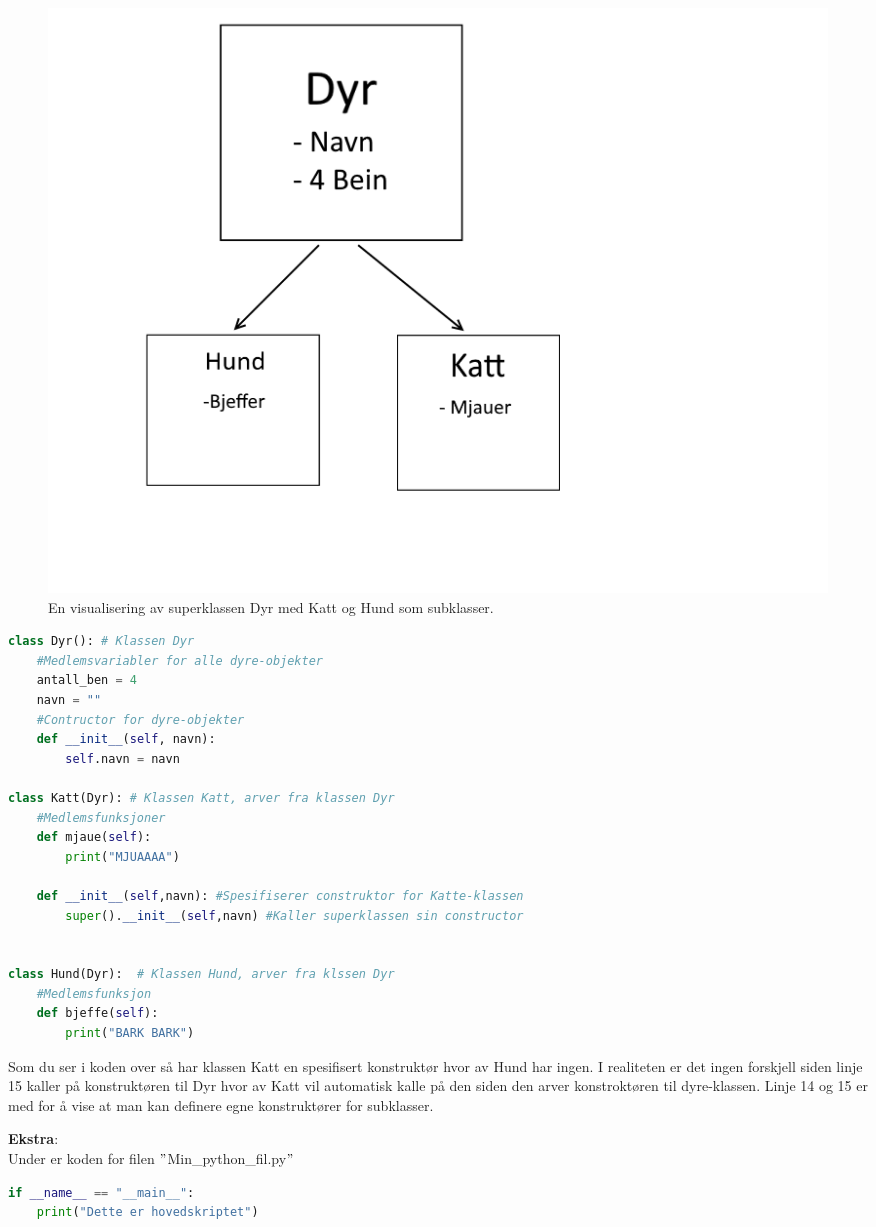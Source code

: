 \begin{figure}[H]
    \centering
    \includegraphics[scale=0.5]{Figures/Klasser_Dyr.png}
    \caption{En visualisering av superklassen Dyr med Katt og Hund som subklasser.}
    \label{fig:uperklasse}
\end{figure}
\begin{lstlisting}[language=python]
class Dyr(): # Klassen Dyr
    #Medlemsvariabler for alle dyre-objekter
    antall_ben = 4
    navn = ""
    #Contructor for dyre-objekter
    def __init__(self, navn):
        self.navn = navn

class Katt(Dyr): # Klassen Katt, arver fra klassen Dyr
    #Medlemsfunksjoner
    def mjaue(self):
        print("MJUAAAA")
        
    def __init__(self,navn): #Spesifiserer construktor for Katte-klassen
        super().__init__(self,navn) #Kaller superklassen sin constructor


class Hund(Dyr):  # Klassen Hund, arver fra klssen Dyr
    #Medlemsfunksjon
    def bjeffe(self):
        print("BARK BARK")
\end{lstlisting}

Som du ser i koden over så har klassen Katt en spesifisert konstruktør hvor av Hund har ingen. I realiteten er det ingen forskjell siden linje 15 kaller på konstruktøren til Dyr hvor av Katt vil automatisk kalle på den siden den arver konstroktøren til dyre-klassen. Linje 14 og 15 er med for å vise at man kan definere egne konstruktører for subklasser.

\textbf{Ekstra}: \\
Under er koden for filen $"$Min\_python\_fil.py$"$
\begin{lstlisting}[language=python]
if __name__ == "__main__":
    print("Dette er hovedskriptet")
\end{lstlisting}

